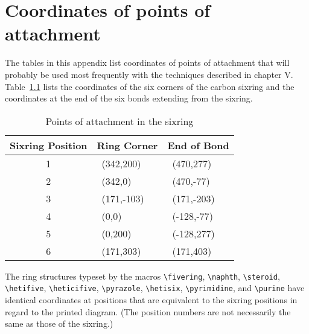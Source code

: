 \chapter{Coordinates of points of attachment}
 \vspace{4mm}
 
 The tables in this appendix list coordinates of points of
 attachment that will probably be used most frequently
 with the techniques described in chapter V.
  Table~\ref{tb:corners}
  lists the coordinates of the six corners
 of the carbon sixring and the coordinates at the end of the six
 bonds extending from the sixring.
 
\begin{table}[p]
\begin{center}
 \begin{tabular}{|c|l|l|}
  \hline
  Sixring Position & Ring Corner & End of Bond \\
  \hline
  1                & \ (342,200)   & \ (470,277)   \\
  2                & \ (342,0)     & \ (470,-77)   \\
  3                & \ (171,-103)  & \ (171,-203)  \\
  4                & \ (0,0)       & \ (-128,-77)  \\
  5                & \ (0,200)     & \ (-128,277)  \\
  6                & \ (171,303)   & \ (171,403)   \\
  \hline
 \end{tabular}
\end{center}
 \caption{Points of attachment in the sixring}
\label{tb:corners}
\end{table}
 
 The ring structures typeset by the macros
 \verb+\fivering+,
 \verb+\naphth+,
 \verb+\steroid+,
 \verb+\hetifive+,
 \verb+\heticifive+,
 \verb+\pyrazole+,
 \verb+\hetisix+,
 \verb+\pyrimidine+, and
 \verb+\purine+ have identical coordinates at positions that are
 equivalent to the sixring positions in regard to the printed
 diagram. (The position numbers are not necessarily the same
 as those of the sixring.)
 
